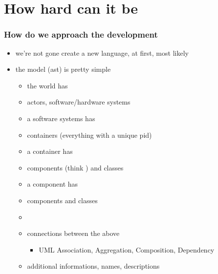 \documentclass[xelatex,13pt]{beamer}
\begin{document}
\section{How hard can it be}
\begin{frame}
	\frametitle{How do we approach the development}
	\begin{itemize}
		\item we're not gone create a new language\pause, at first\pause,
			most likely
		\item the model (ast) is pretty simple
		\begin{itemize}
			\item the world has
			\item actors, software/hardware systems
			\item a software systems has
			\item containers (everything with a unique pid)
			\item a container has
			\item components (think \lstinline@module@) and classes
			\item a component has
			\item components and classes
			\item[]
			\item connections between the above
			\begin{itemize}
				\item UML Association, Aggregation, Composition, Dependency
			\end{itemize}
			\item additional informations, names, descriptions
		\end{itemize}
	\end{itemize}
\end{frame}
\end{document}
